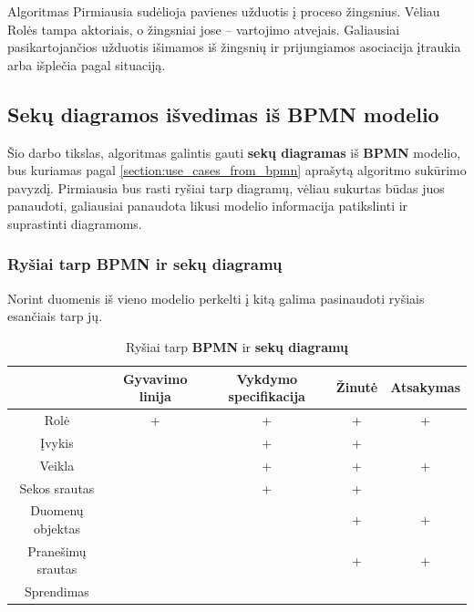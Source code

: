\documentclass{VUMIFInfBakalaurinis}
\begin{document}
Algoritmas Pirmiausia sudėlioja pavienes užduotis į proceso žingsnius. Vėliau Rolės tampa aktoriais, o žingsniai jose – vartojimo atvejais. Galiausiai pasikartojančios užduotis išimamos iš žingsnių ir prijungiamos asociacija įtraukia arba išplečia pagal situaciją.


\subsection{Sekų diagramos išvedimas iš \textbf{BPMN} modelio}

Šio darbo tikslas, algoritmas galintis gauti \textbf{sekų diagramas} iš \textbf{BPMN} modelio, bus kuriamas pagal \ref{section:use_cases_from_bpmn} aprašytą algoritmo sukūrimo pavyzdį. Pirmiausia bus rasti ryšiai tarp diagramų, vėliau sukurtas būdas juos panaudoti, galiausiai panaudota likusi modelio informacija patikslinti ir suprastinti diagramoms.

\subsubsection{Ryšiai tarp \textbf{BPMN} ir \textbf{sekų diagramų}} \label{section:relations_sd_bpmn}

Norint duomenis iš vieno modelio perkelti į kitą galima pasinaudoti ryšiais esančiais tarp jų.

\begin{center}
    \begin{longtable}{ | c | c |  c | c | c |}
    \caption{Ryšiai tarp \textbf{BPMN} ir \textbf{sekų diagramų}}
	\label{tab:relations_sd_bpmn}
    \\ \hline 
     & 
     Gyvavimo linija 
     & 
     Vykdymo specifikacija 
     & 
     Žinutė 
     & 
     Atsakymas 
     \\ 
    \hline 
    Rolė & + & + & + & + \\
    \hline
    Įvykis  & & + & + & \\
    \hline 
    Veikla  & & + & + & + \\
    \hline 
    Sekos srautas  & & + & + & \\
    \hline
    Duomenų objektas  & & & + & +\\
    \hline
    Pranešimų srautas  & & & + & +\\
    \hline
    Sprendimas  & & & & \\
    \hline
    \end{longtable}
\end{center} 
\end{document}
